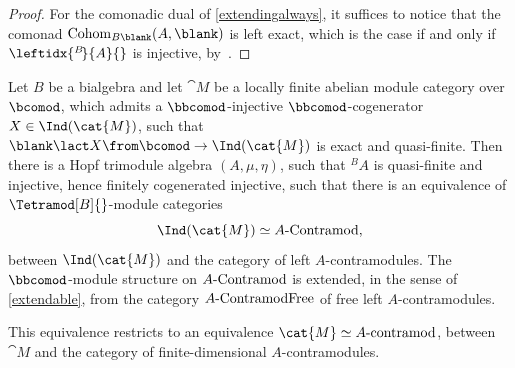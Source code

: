 \begin{proof}
  For the comonadic dual of \cref{extendingalways},
  it suffices to notice that the comonad \(\mathrm{Cohom}_{B\blank}(A,\blank)\) is left exact,
  which is the case if and only if \(\leftidx{^{B}\!}{A}{}\) is injective, by~\cite[1.12]{takeuchi77:morit}.
\end{proof}

\begin{theorem}\label{infinitetrihopfreconstruction}
  Let \(B\) be a bialgebra
  and let \(\cat{M}\) be a locally finite abelian module category over \(\bcomod\),
  which admits a \(\bbcomod\)\hyp{}injective \(\bbcomod\)\hyp{}cogenerator \(X \in \Ind(\cat{M})\),
  such that \(\blank \lact X\from \bcomod \to \Ind(\cat{M})\) is exact and quasi-finite.
  Then there is a Hopf trimodule algebra \((A, \mu, \eta)\),
  such that \({}^{B}\!A\) is quasi-finite and injective,
  hence finitely cogenerated injective,
  such that there is an equivalence of \(\Tetramod[B]{}\)\hyp{}module categories
  \[
    \Ind(\cat{M}) \simeq A\textnormal{-Contramod},
  \]
  between \(\Ind(\cat{M})\) and the category of left \(A\)\hyp{}contramodules.
  The \(\bbcomod\)\hyp{}module structure on \(A\textnormal{-Contramod}\) is extended,
  in the sense of \cref{extendable},
  from the category \(A\textnormal{-ContramodFree}\) of free left \(A\)\hyp{}contramodules.

  This equivalence restricts to an equivalence \(\cat{M} \simeq A\textnormal{-contramod}\),
  between \(\cat{M}\) and the category of finite\hyp{}dimensional \(A\)\hyp{}contramodules.
\end{theorem}
